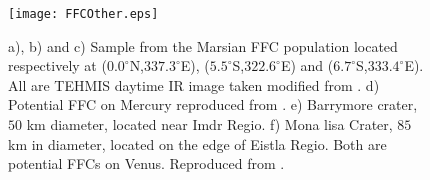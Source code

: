 \begin{figure}[htpb]
  \begin{center}
    \graphicspath{ {/Users/thorey/Documents/These/Manuscript/Figure/Chapter7/} }
    \texttt{[image: FFCOther.eps]}
    \caption{a),  b) and  c) Sample  from the  Marsian FFC  population
      located  respectively  at ($0.0^{\circ}$N,$337.3  ^{\circ}  $E),
      ($5.5^{\circ}$S,$322.6         ^{\circ}          $E)         and
      ($6.7^{\circ}$S,$333.4^{\circ}$E).   All are  TEHMIS daytime  IR
      image taken modified from \citet{Sato:2010ex}.  d) Potential FFC
      on Mercury reproduced from \citet{Schultz:1977ec}.  e) Barrymore
      crater, $50$ km diameter, located near Imdr Regio.  f) Mona lisa
      Crater,  $85$ km  in diameter,  located  on the  edge of  Eistla
      Regio.   Both  are potential  FFCs  on  Venus.  Reproduced  from
      \citet{Wichman:1995ju}.}
    \label{C7-FFCOther}
  \end{center}
\end{figure}

